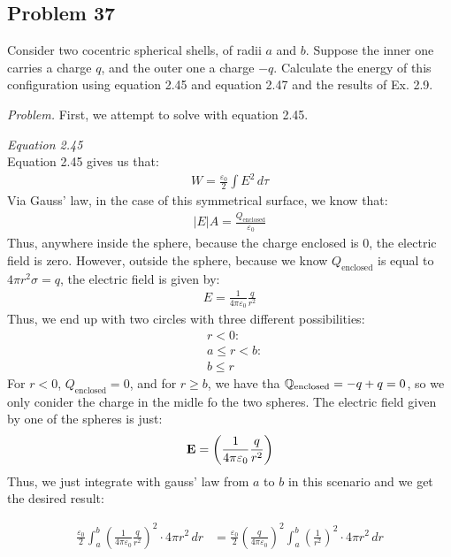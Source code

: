 \documentclass[10pt,oneside]{book}
\newcommand{\gspc}{\vspace{0.13cm}} %
\newcommand{\gline}[0]{\gspc\\} %
\newenvironment{problem}[1]
  {\vspace{-0.1cm}\begin{tcolorbox}[problembox]
   \textit{Problem. }#1}
  {\end{tcolorbox}\gspc}
\newenvironment{subproblem}[2]
  {\vspace{-0.1cm}\begin{tcolorbox}[subproblembox]
   \textit{#1 }#2}
  {\end{tcolorbox}\gspc}
\newcommand{\cpr}[1]{\left(#1\right)}
\begin{document}
\subsection*{Problem 37}
Consider two cocentric spherical shells, of radii $a$ and $b$. Suppose the inner one carries a charge $q$, and the outer one a charge $-q$. Calculate the energy of this configuration using equation 2.45 and equation 2.47 and the results of Ex. 2.9.
\begin{problem}
  First, we attempt to solve with equation 2.45.
  \begin{subproblem}{Equation 2.45}\gline{}
    Equation 2.45 gives us that:
    \begin{align*}
      \boxed{W = \frac{\varepsilon_0}2\int E^2\,d\tau}
    \end{align*}
    Via Gauss' law, in the case of this symmetrical surface, we know that:
    \begin{align*}
      |E|A = \frac{Q_\text{enclosed}}{\varepsilon_0}
    \end{align*}
    Thus, anywhere inside the sphere, because the charge enclosed is 0, the electric field is zero. However, outside the sphere, because we know $Q_\text{enclosed}$ is equal to $4\pi r^2 \sigma = q$, the electric field is given by:
    \begin{align}
      E=\frac{1}{4\pi\varepsilon_0}\frac{q}{r^2}
    \end{align}
    Thus, we end up with two circles with three different possibilities:
    \begin{align*}
      &r<0:\\
      &a\le r < b:\\
      &b\le r
    \end{align*}
    For $r< 0$, $Q_\text{enclosed}=0$, and for $r \ge b$, we have tha $\mathbb{Q}_\text{enclosed} = -q + q = 0$, so we only conider the charge in the midle fo the two spheres. The electric field given by one of the spheres is just:
    \begin{align*}
      \vE = \cpr{\frac{1}{4\pi\varepsilon_0}\frac{q}{r^2}}
    \end{align*}
    Thus, we just integrate with gauss' law from $a$ to $b$ in this scenario and we get the desired result:
  \end{subproblem}
  \begin{subproblem}{}
    \begin{align*}
      \frac{\varepsilon_0}2\int_a^b\cpr{\frac{1}{4\pi\varepsilon_0}\frac{q}{r^2}}^2\cdot 4\pi r^2 \,dr&=\frac{\varepsilon_0}2\cpr{\frac{q}{4\pi\varepsilon_0}}^2\int_a^b \cpr{\frac{1}{r^2}}^2 \cdot 4\pi r^2\,dr\\

\end{align*}
\end{subproblem}
\end{problem}
\end{document}
